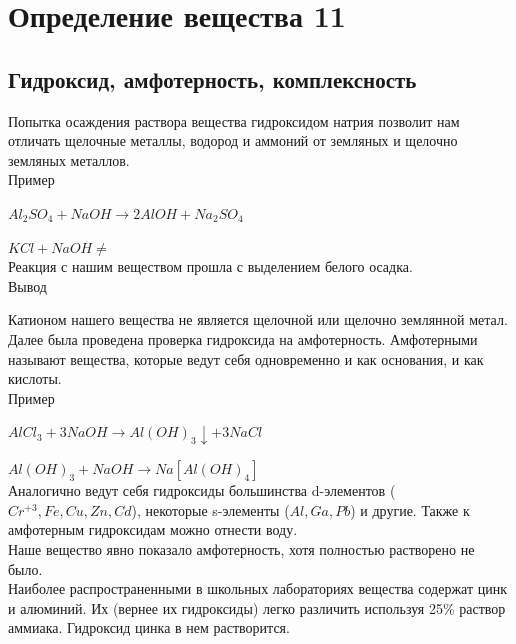 \documentclass[a4paper,14pt,notitlepage,twoside]{article}
\begin{document}
    \section{Определение вещества 11}
        \subsection{Гидроксид, амфотерность, комплексность}
            Попытка осаждения раствора вещества гидроксидом натрия позволит 
            нам отличать щелочные металлы, водород и аммоний от земляных 
            и щелочно земляных металлов.\\

            Пример
            \par$Al_2SO_4 +NaOH \to 2AlOH + Na_2SO_4$
            \par$KCl + NaOH \ne$\\

            Реакция с нашим веществом прошла с выделением белого осадка.\\

            Вывод 

            Катионом нашего вещества не является щелочной или щелочно землянной
            метал.\\
            
            Далее была проведена проверка гидроксида на амфотерность.
            Амфотерными называют вещества, которые ведут себя одновременно 
            и как основания, и как кислоты.\\

            Пример
            \par$AlCl_3 + 3NaOH \to Al(OH)_3 \downarrow + 3NaCl$
            \par$Al(OH)_3 + NaOH \to Na[Al(OH)_4]$\\

            Аналогично ведут себя гидроксиды большинства d-элементов ($Cr^{+3}, Fe,
            Cu, Zn, Cd$), некоторые s-элементы ($Al, Ga, Pb$) и другие. Также к
            амфотерным гидроксидам можно отнести воду.\\

            Наше вещество явно показало амфотерность, хотя полностью растворено 
            не было.\\

            Наиболее распространенными в школьных лабораториях вещества содержат 
            цинк и алюминий. Их (вернее их гидроксиды) легко различить используя
            25\% раствор аммиака. Гидроксид цинка в нем растворится.\\
\end{document}
